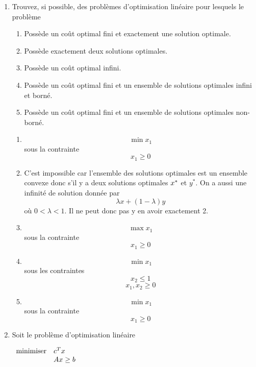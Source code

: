 \begin{enumerate}
  \item  Trouvez, si possible, des problèmes d'optimisation linéaire pour lesquels le problème

    \begin{enumerate}
      \item Poss\`ede un co\^ut optimal fini et exactement une solution optimale.
      \item Poss\`ede exactement deux solutions optimales.
      \item Possède un coût optimal infini.
      \item Possède un coût optimal fini et un ensemble de solutions optimales infini et borné.
      \item Possède un coût optimal fini et un ensemble de solutions  optimales non-borné.

    \end{enumerate}

    \begin{solution}
      \begin{enumerate}
        \item
          $$ \min x_1$$
          sous la contrainte
          $$ x_{1} \geq 0$$
        \item C'est impossible car l'ensemble des solutions optimales
          est un ensemble convexe donc s'il y a deux solutions optimales
          $x^*$ et $y^*$. On a aussi une infinité de solution donnée par
          \[ \lambda x + (1-\lambda) y \]
          où $0 < \lambda < 1$.
          Il ne peut donc pas y en avoir exactement 2.
        \item
          $$ \max x_1 $$
          sous la contrainte
          $$ x_1 \geq 0 $$
        \item
          $$ \min x_{1}$$
          sous les contraintes
          $$ x_{2} \leq 1$$
          $$ x_{1}, x_{2} \geq 0$$
        \item
          $$ \min x_1 $$
          sous la contrainte
          $$ x_1 \geq 0$$
      \end{enumerate}
    \end{solution}

  \item Soit le problème d'optimisation linéaire

    $
    \begin{array}{ll}
      \mbox{minimiser} &  c^T x \\
      \mbox{ }
      & A x \geq b
    \end{array}
    $


\end{enumerate}
